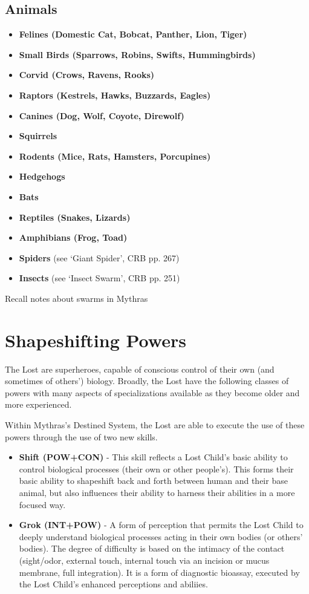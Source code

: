 \documentclass[letterpaper,serif]{rpg-module}
\begin{document}
\subsection{Animals}

\begin{itemize}
    \item \textbf{Felines (Domestic Cat, Bobcat, Panther, Lion, Tiger)}
    \item \textbf{Small Birds (Sparrows, Robins, Swifts, Hummingbirds)}
    \item \textbf{Corvid (Crows, Ravens, Rooks)}
    \item \textbf{Raptors (Kestrels, Hawks, Buzzards, Eagles)}
    \item \textbf{Canines (Dog, Wolf, Coyote, Direwolf)}
    \item \textbf{Squirrels}
    \item \textbf{Rodents (Mice, Rats, Hamsters, Porcupines)}
    \item \textbf{Hedgehogs}
    \item \textbf{Bats}
    \item \textbf{Reptiles (Snakes, Lizards)}
    \item \textbf{Amphibians (Frog, Toad)}
    \item \textbf{Spiders} (see `Giant Spider', CRB pp. 267)
    \item \textbf{Insects} (see `Insect Swarm', CRB pp. 251)
\end{itemize}

Recall notes about swarms in Mythras

\section{Shapeshifting Powers}

The Lost are superheroes, capable of conscious control of their own (and sometimes of others') biology. Broadly, the Lost have the following classes of powers with many aspects of specializations available as they become older and more experienced. 

Within Mythras's Destined System, the Lost are able to execute the use of these powers through the use of two new skills. 

\begin{itemize}
   \item \textbf{Shift (POW+CON)} - This skill reflects a Lost Child's basic ability 
   to control biological processes (their own or other people's). This forms their basic ability to shapeshift back and forth between human and their base animal, but also influences their ability to harness their abilities in a more focused way. 
   \item \textbf{Grok (INT+POW)} - A form of perception that permits the Lost Child to deeply
   understand biological processes acting in their own bodies (or others' bodies). The 
   degree of difficulty is based on the intimacy of the contact (sight/odor, external touch,  internal touch via an incision or mucus membrane, full integration). It is a form of diagnostic bioassay, executed by the Lost Child's enhanced perceptions and abiliies.   
\end{itemize}
\end{document}

